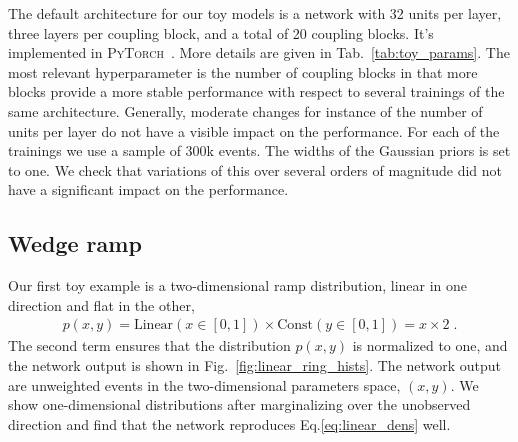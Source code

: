 The default architecture for our toy models is a
network with 32 units per layer, three layers per
coupling block, and a total of 20 coupling blocks. It's implemented in \textsc{PyTorch}~\cite{pytorch}. More details are
given in Tab.~\ref{tab:toy_params}.  The most relevant hyperparameter
is the number of coupling blocks in that more blocks provide a more
stable performance with respect to several trainings of the same
architecture.  Generally, moderate changes for instance of the number
of units per layer do not have a visible impact on the
performance. For each of the trainings we use a sample of 300k
events. The widths of the Gaussian priors is set to one. We check that
variations of this over several orders of magnitude did not have a
significant impact on the performance.

\subsection{Wedge ramp}
\label{sec:toy_wedge}

Our first toy example is a two-dimensional ramp distribution, linear
in one direction and flat in the other,
%
\begin{align}
p(x, y) = \text{Linear}(x \in [0, 1]) \times \text{Const}(y \in [0, 1]) = x \times 2 \; .
\label{eq:linear_dens}
\end{align}
%
The second term ensures that the distribution $p(x,y)$ is normalized
to one, and the network output is shown in
Fig.~\ref{fig:linear_ring_hists}. The network output are unweighted
events in the two-dimensional parameters space, $(x,y)$. We show
one-dimensional distributions after marginalizing over the unobserved
direction and find that the network reproduces
Eq.\eqref{eq:linear_dens} well.

